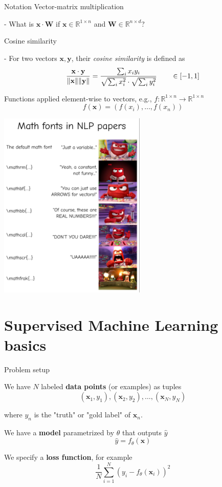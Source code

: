 \documentclass[12pt]{beamer}
\begin{document}
\begin{frame}{Notation}
Vector-matrix multiplication

- What is $\mathbf{x} \cdot \mathbf{W}$ if $\mathbf{x} \in \mathbb{R}^{1 \times n}$ and $\mathbf{W} \in \mathbb{R}^{n \times d}$?

Cosine similarity

- For two vectors $\mathbf{x}, \mathbf{y}$, their \emph{cosine similarity} is defined as
$$
\frac{\mathbf{x} \cdot \mathbf{y}}{\norm{\mathbf{x}} \norm{\mathbf{y}}} =
\frac{\sum_i x_i y_i}{\sqrt{\sum_i {x_i^2}} \cdot \sqrt{\sum_i{y_i^2}}} \qquad \in \mathopen[ -1, 1\mathclose]
$$

Functions applied element-wise to vectors, e.g., $f: \mathbb{R}^{1 \times n} \to \mathbb{R}^{1 \times n}$
$$
f(\mathbf{x}) = (f(x_i), \dots, f(x_n))
$$

\end{frame}

\begin{frame}

\begin{center}
	\includegraphics[width=7cm]{img/FQNlPsJXoAYMSd1.png}
\end{center}

\end{frame}

\section{Supervised Machine Learning basics}

\begin{frame}{Problem setup}
	
We have $N$ labeled \textbf{data points} (or examples) as tuples
$$
(\mathbf{x}_1, y_1), (\mathbf{x}_2, y_2), \dots, (\mathbf{x}_N, y_N)
$$

where $y_n$ is the "truth" or "gold label" of $\mathbf{x}_n$.

We have a \textbf{model} parametrized by $\theta$ that outputs $\hat{y}$
$$
\hat{y} = f_{\theta}(\mathbf{x})
$$
	
We specify a \textbf{loss function}, for example
$$
\frac{1}{N} \sum_{i = 1}^{N} \left( y_i - f_{\theta}(\mathbf{x}_i) \right)^2
$$
	
\end{frame}
\end{document}

